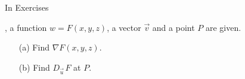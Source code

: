 {\noindent In Exercises}
{, a function $w=F(x,y,z)$, a vector $\vec v$ and a point $P$ are given. 
\begin{enumerate}
	\item [(a)] Find $\nabla F(x,y,z)$.
	\item [(b)] Find $D_{\vec u\,}F$ at $P$.
\end{enumerate}
}
